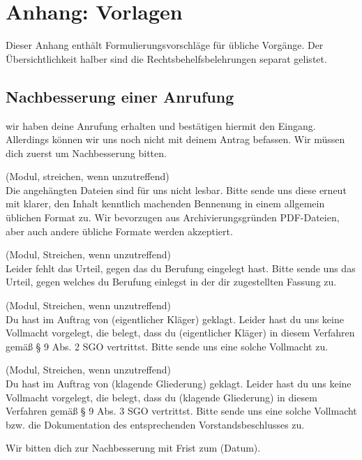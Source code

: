 
\chapter{Anhang: Vorlagen}
\label{Vorlage}
Dieser Anhang enthält Formulierungsvorschläge für übliche Vorgänge.
Der Übersichtlichkeit halber sind die Rechtsbehelfsbelehrungen separat gelistet.

\section{Nachbesserung einer Anrufung}
\label{Vorlage:Anrufungsnachbesserung}
wir haben deine Anrufung erhalten und bestätigen hiermit den Eingang.
Allerdings können wir uns noch nicht mit deinem Antrag befassen.
Wir müssen dich zuerst um Nachbesserung bitten.

(Modul, streichen, wenn unzutreffend)\\
Die angehängten Dateien sind für uns nicht lesbar.
Bitte sende uns diese erneut mit klarer, den Inhalt kenntlich machenden Bennenung in einem allgemein üblichen Format zu.
Wir bevorzugen aus Archivierungsgründen PDF-Dateien, aber auch andere übliche Formate werden akzeptiert.

(Modul, Streichen, wenn unzutreffend)\\
Leider fehlt das Urteil, gegen das du Berufung eingelegt hast.
Bitte sende uns das Urteil, gegen welches du Berufung einlegst in der dir zugestellten Fassung zu.

(Modul,  Streichen, wenn unzutreffend)\\
Du hast im Auftrag von (eigentlicher Kläger) geklagt.
Leider hast du uns keine Vollmacht vorgelegt, die belegt, dass du (eigentlicher Kläger) in diesem Verfahren gemäß § 9 Abs. 2 SGO vertrittst.
Bitte sende uns eine solche Vollmacht zu.

(Modul,  Streichen, wenn unzutreffend)\\
Du hast im Auftrag von (klagende Gliederung) geklagt.
Leider hast du uns keine Vollmacht vorgelegt, die belegt, dass du (klagende Gliederung) in diesem Verfahren gemäß § 9 Abs. 3 SGO vertrittst.
Bitte sende uns eine solche Vollmacht bzw. die Dokumentation des entsprechenden Vorstandsbeschlusses zu.

Wir bitten dich zur Nachbesserung mit Frist zum (Datum).

